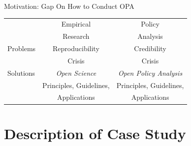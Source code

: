 \documentclass{beamer}
\begin{document}
\begin{frame}[noframenumbering]{Motivation: Gap On How to Conduct OPA}
\begin{table}[ht]
\centering
\begin{tabular}[t]{|l|c|c|}
\hline
& Empirical  & Policy \\
& Research & Analysis \\

\hline
Problems & Reproducibility  &  Credibility \\
				 &  Crisis & Crisis \\
\hline
Solutions &  \textit{Open Science}&    \textit{Open Policy Analysis} \\
 & Principles, Guidelines,  &   Principles, Guidelines,\\
 & Applications &   Applications\\

\hline
\end{tabular}
\end{table}%
\end{frame}
 

\section[Case Study]{Description of Case Study}
\end{document}
